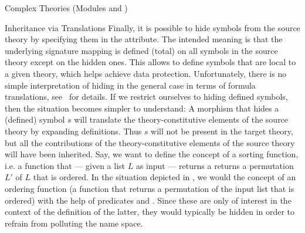 \begin{tchapter}[id=complex-theories,short=Complex Theories]{Complex Theories (Modules
    {} and {})}
\begin{tsection}[id=morphisms]{Inheritance via Translations}
Finally, it is possible to hide symbols from the source theory by specifying them in the
{} attribute. The intended meaning is that the underlying
signature mapping is defined (total) on all symbols in the source theory except on the
hidden ones. This allows to define symbols that are local to a given theory, which helps
achieve data protection. Unfortunately, there is no simple interpretation of hiding in the
general case in terms of formula translations, see~\cite{CoFI:2004:CASL-RM,MAH-06-a} for
details. {}  If we
restrict ourselves to hiding defined symbols, then the situation becomes simpler to
understand: A morphism that hides a (defined) symbol $s$ will translate the
theory-constitutive elements of the source theory by expanding definitions. Thus $s$ will
not be present in the target theory, but all the contributions of the theory-constitutive
elements of the source theory will have been inherited. Say, we want to define the concept
of a sorting function, i.e. a function that --- given a list $L$ as input --- returns a
returns a permutation $L'$ of $L$ that is ordered. In the situation depicted in
{}, we would the concept of an ordering function (a function
that returns a permutation of the input list that is ordered) with the help of predicates
{} and {}. Since these are only of interest in the context
of the definition of the latter, they would typically be hidden in order to refrain from
polluting the name space.


\end{tsection}
\end{tchapter}
